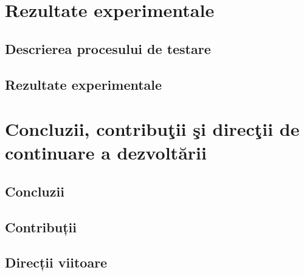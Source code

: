 \documentclass[12pt,a4paper]{report}
\begin{document}
\chapter{Rezultate experimentale}
\section{Descrierea procesului de testare}
\section{Rezultate experimentale}

\chapter{Concluzii, contribuţii şi direcţii de continuare a dezvoltării}
\section{Concluzii}
\section{Contribuții}
\section{Direcții viitoare}



\end{document}
